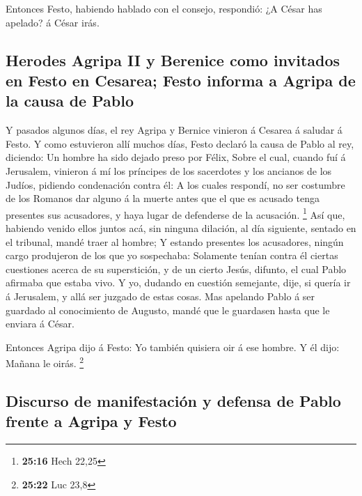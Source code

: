  Entonces Festo, habiendo hablado con el consejo,
respondió: ¿A César has apelado? á César irás.

\hypertarget{herodes-agripa-ii-y-berenice-como-invitados-en-festo-en-cesarea-festo-informa-a-agripa-de-la-causa-de-pablo}{%
\subsection{Herodes Agripa II y Berenice como invitados en Festo en
Cesarea; Festo informa a Agripa de la causa de
Pablo}\label{herodes-agripa-ii-y-berenice-como-invitados-en-festo-en-cesarea-festo-informa-a-agripa-de-la-causa-de-pablo}}

 Y pasados algunos días, el rey Agripa y Bernice vinieron
á Cesarea á saludar á Festo.  Y como estuvieron allí
muchos días, Festo declaró la causa de Pablo al rey, diciendo: Un hombre
ha sido dejado preso por Félix,  Sobre el cual, cuando
fuí á Jerusalem, vinieron á mí los príncipes de los sacerdotes y los
ancianos de los Judíos, pidiendo condenación contra él: 
A los cuales respondí, no ser costumbre de los Romanos dar alguno á la
muerte antes que el que es acusado tenga presentes sus acusadores, y
haya lugar de defenderse de la acusación. \footnote{\textbf{25:16} Hech
  22,25}  Así que, habiendo venido ellos juntos acá, sin
ninguna dilación, al día siguiente, sentado en el tribunal, mandé traer
al hombre;  Y estando presentes los acusadores, ningún
cargo produjeron de los que yo sospechaba:  Solamente
tenían contra él ciertas cuestiones acerca de su superstición, y de un
cierto Jesús, difunto, el cual Pablo afirmaba que estaba vivo.
 Y yo, dudando en cuestión semejante, dije, si quería ir
á Jerusalem, y allá ser juzgado de estas cosas.  Mas
apelando Pablo á ser guardado al conocimiento de Augusto, mandé que le
guardasen hasta que le enviara á César.

 Entonces Agripa dijo á Festo: Yo también quisiera oir á
ese hombre. Y él dijo: Mañana le oirás. \footnote{\textbf{25:22} Luc
  23,8}

\hypertarget{discurso-de-manifestaciuxf3n-y-defensa-de-pablo-frente-a-agripa-y-festo}{%
\subsection{Discurso de manifestación y defensa de Pablo frente a Agripa
y
Festo}\label{discurso-de-manifestaciuxf3n-y-defensa-de-pablo-frente-a-agripa-y-festo}}

